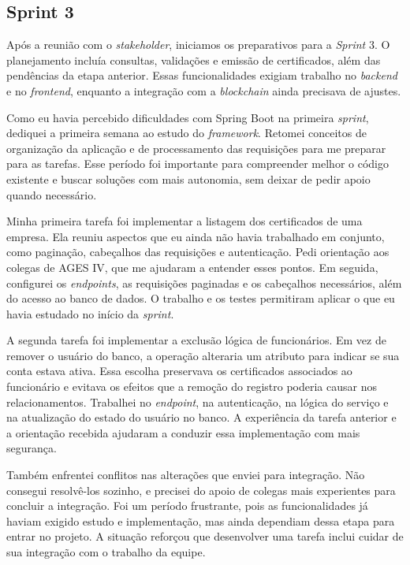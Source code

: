 \clearpage
\subsection{Sprint 3}

Após a reunião com o \textit{stakeholder}, iniciamos os preparativos para a \textit{Sprint} 3. O planejamento incluía consultas, validações e emissão de certificados, além das pendências da etapa anterior. Essas funcionalidades exigiam trabalho no \textit{backend} e no \textit{frontend}, enquanto a integração com a \textit{blockchain} ainda precisava de ajustes.

Como eu havia percebido dificuldades com Spring Boot na primeira \textit{sprint}, dediquei a primeira semana ao estudo do \textit{framework}. Retomei conceitos de organização da aplicação e de processamento das requisições para me preparar para as tarefas. Esse período foi importante para compreender melhor o código existente e buscar soluções com mais autonomia, sem deixar de pedir apoio quando necessário.

Minha primeira tarefa foi implementar a listagem dos certificados de uma empresa. Ela reuniu aspectos que eu ainda não havia trabalhado em conjunto, como paginação, cabeçalhos das requisições e autenticação. Pedi orientação aos colegas de \ac{AGES} IV, que me ajudaram a entender esses pontos. Em seguida, configurei os \textit{endpoints}, as requisições paginadas e os cabeçalhos necessários, além do acesso ao banco de dados. O trabalho e os testes permitiram aplicar o que eu havia estudado no início da \textit{sprint}.

A segunda tarefa foi implementar a exclusão lógica de funcionários. Em vez de remover o usuário do banco, a operação alteraria um atributo para indicar se sua conta estava ativa. Essa escolha preservava os certificados associados ao funcionário e evitava os efeitos que a remoção do registro poderia causar nos relacionamentos. Trabalhei no \textit{endpoint}, na autenticação, na lógica do serviço e na atualização do estado do usuário no banco. A experiência da tarefa anterior e a orientação recebida ajudaram a conduzir essa implementação com mais segurança.

Também enfrentei conflitos nas alterações que enviei para integração. Não consegui resolvê-los sozinho, e precisei do apoio de colegas mais experientes para concluir a integração. Foi um período frustrante, pois as funcionalidades já haviam exigido estudo e implementação, mas ainda dependiam dessa etapa para entrar no projeto. A situação reforçou que desenvolver uma tarefa inclui cuidar de sua integração com o trabalho da equipe.


